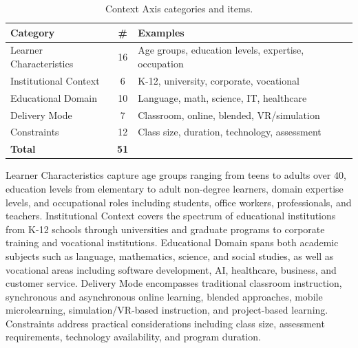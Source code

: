 \begin{table}[t]
\centering
\small
\caption{Context Axis categories and items.}
\label{tab:context-axis}
\begin{tabular}{lcp{4.5cm}}
\toprule
\textbf{Category} & \textbf{\#} & \textbf{Examples} \\
\midrule
Learner Characteristics & 16 & Age groups, education levels, expertise, occupation \\
Institutional Context & 6 & K-12, university, corporate, vocational \\
Educational Domain & 10 & Language, math, science, IT, healthcare \\
Delivery Mode & 7 & Classroom, online, blended, VR/simulation \\
Constraints & 12 & Class size, duration, technology, assessment \\
\midrule
\textbf{Total} & \textbf{51} & \\
\bottomrule
\end{tabular}
\end{table}

Learner Characteristics capture age groups ranging from teens to adults over 40, education levels from elementary to adult non-degree learners, domain expertise levels, and occupational roles including students, office workers, professionals, and teachers. Institutional Context covers the spectrum of educational institutions from K-12 schools through universities and graduate programs to corporate training and vocational institutions. Educational Domain spans both academic subjects such as language, mathematics, science, and social studies, as well as vocational areas including software development, AI, healthcare, business, and customer service. Delivery Mode encompasses traditional classroom instruction, synchronous and asynchronous online learning, blended approaches, mobile microlearning, simulation/VR-based instruction, and project-based learning. Constraints address practical considerations including class size, assessment requirements, technology availability, and program duration.

